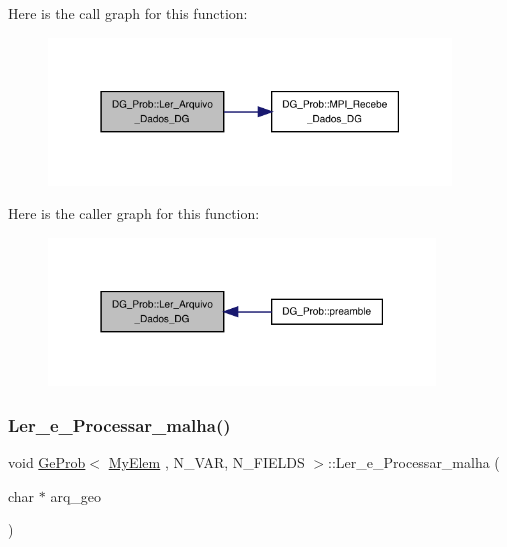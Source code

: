 Here is the call graph for this function\+:
\nopagebreak
\begin{figure}[H]
\begin{center}
\leavevmode
\includegraphics[width=303pt]{classDG__Prob_ab28a5690b7fc91e44fe435107a4076ae_cgraph}
\end{center}
\end{figure}
Here is the caller graph for this function\+:
\nopagebreak
\begin{figure}[H]
\begin{center}
\leavevmode
\includegraphics[width=291pt]{classDG__Prob_ab28a5690b7fc91e44fe435107a4076ae_icgraph}
\end{center}
\end{figure}
\mbox{\label{classGeProb_ac1030cadfbc0d88e817617a927dbc31f}} 
\subsubsection{\texorpdfstring{Ler\+\_\+e\+\_\+\+Processar\+\_\+malha()}{Ler\_e\_Processar\_malha()}}
{\footnotesize\ttfamily void \hyperlink{classGeProb}{Ge\+Prob}$<$ \hyperlink{DG__Prob_8h_a83cd887ced9a6587428f267e50cd4787}{My\+Elem} , N\+\_\+\+V\+AR, N\+\_\+\+F\+I\+E\+L\+DS $>$\+::Ler\+\_\+e\+\_\+\+Processar\+\_\+malha (\begin{DoxyParamCaption}\item[{char $\ast$}]{arq\+\_\+geo }\end{DoxyParamCaption})\hspace{0.3cm}{\ttfamily [inherited]}}



